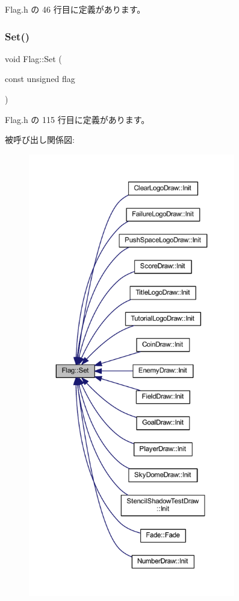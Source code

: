  Flag.\+h の 46 行目に定義があります。

\mbox{\label{class_flag_a362d2f64c03c0b596004f3eba4cb14a3}} 
\subsubsection{\texorpdfstring{Set()}{Set()}}
{\footnotesize\ttfamily void Flag\+::\+Set (\begin{DoxyParamCaption}\item[{const unsigned}]{flag }\end{DoxyParamCaption})\hspace{0.3cm}{\ttfamily [inline]}}



 Flag.\+h の 115 行目に定義があります。

被呼び出し関係図\+:\nopagebreak
\begin{figure}[H]
\begin{center}
\leavevmode
\includegraphics[height=550pt]{class_flag_a362d2f64c03c0b596004f3eba4cb14a3_icgraph}
\end{center}
\end{figure}


